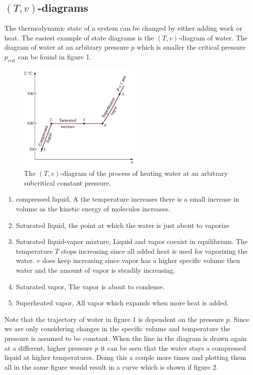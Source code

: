 \documentclass[11pt, a4paper]{article}
\begin{document}
\subsection{$(T, v)$-diagrams}
The thermodynamic state of a system can be changed by either adding work or heat. The easiest example of state diagrams is the $(T, v)$-diagram of water. The diagram of water at an arbitrary pressure $p$ which is smaller the critical pressure $p_{crit}$ can be found in figure 1.
\begin{figure}[h]
  \centerline{\includegraphics[width=60mm]{images/water process.png}}
  \caption{The $(T, v)$-diagram of the process of heating water at an arbitrary subcritical constant pressure.}
\end{figure}
\begin{enumerate}
  \item compressed liquid, A the temperature increases there is a small increase in volume as the kinetic energy of molecules increases.
  \item Saturated liquid, the point at which the water is just about to vaporize
  \item Saturated liquid-vapor mixture, Liquid and vapor coexist in equilibrium. The temperature $T$ stops increasing since all added heat is used for vaporizing the water. $v$ does keep increasing since vapor has a higher specific volume then water and the amount of vapor is steadily increasing.
  \item Saturated vapor, The vapor is about to condense.
  \item Superheated vapor, All vapor which expands when more heat is added.
\end{enumerate}
Note that the trajectory of water in figure 1 is dependent on the pressure $p$. Since we are only considering changes in the specific volume and temperature the pressure is assumed to be constant. When the line in the diagram is drawn again at a different, higher pressure $p$ it can be seen that the water stays a compressed liquid at higher temperatures. Doing this a couple more times and plotting them all in the same figure would result in a curve which is shown if figure 2. 
\end{document}
